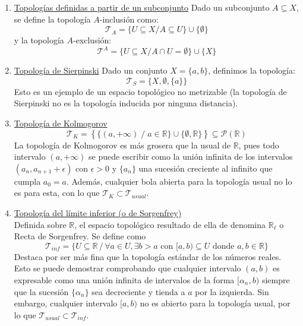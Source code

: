 \documentclass[12pt,twoside]{report}
\newcommand\mc[1]{\mathcal{#1}}
\theoremstyle{azul}
\theoremstyle{azul2}
\theoremstyle{plain}
\theoremstyle{definition}
\theoremstyle{remark}
\begin{document}
\begin{enumerate}
    Equivalentemente, la topología inducida sobre $S$ es la topología menos fina que hace que la aplicación inclusión $i:S \hookrightarrow X$ sea continua. Como es de esperar, todo subespacio topológico es un espacio topológico en sí mismo considerando la topología $\mc{T}_{|_S}$ en abstracto. Se profundizará más en este tema en  \textcolor{blue}{\textbf{\hyperref[subesp]{2.3. Subespacios}}}
    \item \underline{Topologías definidas a partir de un subconjunto}
    Dado un subconjunto $A\subseteq X$, se define la topología $A$-inclusión como:
    $$\mc{T}_A=\{U\subseteq X / A\subseteq U\}\cup \{\emptyset\}$$
    y la topología $A$-exclusión:
    $$\mc{T}^A=\{U\subseteq X
/ A\cap U=\emptyset\}\cup \{X\}$$    
     \item \underline{Topología de Sierpinski}
     Dado un conjunto $X=\{a,b\}$, definimos la topología:
     $$\mc{T}_S=\{X,\emptyset,\{a\}\}$$
     Esto es un ejemplo de un espacio topológico no metrizable (la topología de Sierpinski no es la topología inducida por ninguna distancia).
    \item \underline{Topología de Kolmogorov}
    $$\mc{T}_{K} = \left\{\{ (a, +  \infty)   \; / \; a \in \mathbb{R} \} \cup \{\emptyset, \mathbb{R}\}\right\} \subseteq \mc{P}(\mathbb{R})$$
    La topología de Kolmogorov es más grosera que la usual de $\mathbb{R}$, pues todo intervalo $(a,+\infty)$ se puede escribir como la unión infinita de los intervalos $(a_n, a_{n+1} + \epsilon)$ con $\epsilon > 0$ y $\{a_n\}$ una sucesión creciente al infinito que cumpla $a_0 = a$. Además, cualquier bola abierta para la topología usual no lo es para esta, con lo que $\mc{T}_K \subset \mc{T}_{usual}$.
     \item \underline{Topología del límite inferior (o de Sorgenfrey)} \\
    Definida sobre $\mathbb{R}$, el espacio topológico resultado de ella de denomina $\mathbb{R}_{\ell}$ o Recta de Sorgenfrey. Se define como \vspace{-2mm}
    $$ \mc{T}_{inf} =\{U\subseteq \mathbb{R}\,/\, \forall a \in U, \exists b>a \text{ con } [a,b)\subseteq U \text{ donde }  a,b \in \mathbb{R}\}$$
    Destaca por ser más fina que la topología estándar de los números reales. Esto se puede demostrar comprobando que cualquier intervalo $(a,b)$ es expresable como una unión infinita de intervalos de la forma $[\alpha_n,b)$ siempre que la sucesión $\{\alpha_n\}$ sea decreciente y tienda a $a$ por la izquierda. Sin embargo, cualquier intervalo $[a,b)$ no es abierto para la topología usual, por lo que $\mc{T}_{usual} \subset \mc{T}_{inf}$.\\

\end{enumerate}
\end{document}
